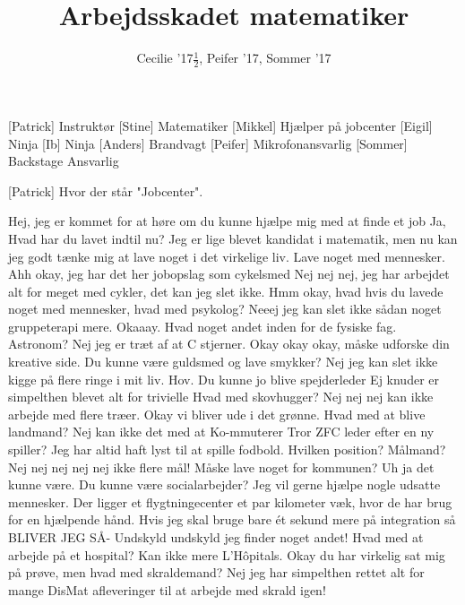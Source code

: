 \documentclass[a4paper,11pt]{article}
\title{Arbejdsskadet matematiker}
\author{Cecilie '17$\frac{1}{2}$, Peifer '17, Sommer '17}
\begin{document}
\maketitle

\begin{roles}
[Patrick] Instruktør
[Stine] Matematiker
[Mikkel] Hjælper på jobcenter
[Eigil] Ninja
[Ib] Ninja
[Anders] Brandvagt
[Peifer] Mikrofonansvarlig
[Sommer] Backstage Ansvarlig
\end{roles}

\begin{props}
    [Patrick]
     Hvor der står "Jobcenter".
\end{props}

\begin{sketch}

 Hej, jeg er kommet for at høre om du kunne hjælpe mig med at finde et job
 Ja, Hvad har du lavet indtil nu?
 Jeg er lige blevet kandidat i matematik, men nu kan jeg godt tænke mig at lave noget i det virkelige liv. Lave noget med mennesker.
 Ahh okay, jeg har det her jobopslag som cykelsmed
 Nej nej nej, jeg har arbejdet alt for meget med cykler, det kan jeg slet ikke.
 Hmm okay, hvad hvis du lavede noget med mennesker, hvad med psykolog?
 Neeej jeg kan slet ikke sådan noget gruppeterapi mere.
 Okaaay. Hvad noget andet inden for de fysiske fag. Astronom?
 Nej jeg er træt af at C stjerner.
Okay okay okay, måske udforske din kreative side. Du kunne være guldsmed og lave smykker? 
 Nej jeg kan slet ikke kigge på flere ringe i mit liv.
 Hov. Du kunne jo blive spejderleder
 Ej knuder er simpelthen blevet alt for trivielle
 Hvad med skovhugger?
 Nej nej nej kan ikke arbejde med flere træer.
 Okay vi bliver ude i det grønne. Hvad med at blive landmand?
 Nej kan ikke det med at Ko-mmuterer
 Tror ZFC leder efter en ny spiller?
 Jeg har altid haft lyst til at spille fodbold. Hvilken position?
 Målmand?
 Nej nej nej nej nej ikke flere mål!
 Måske lave noget for kommunen?
 Uh ja det kunne være.
 Du kunne være socialarbejder?
 Jeg vil gerne hjælpe nogle udsatte mennesker.
 Der ligger et flygtningecenter et par kilometer væk, hvor de har brug for en hjælpende hånd.
 Hvis jeg skal bruge bare ét sekund mere på integration så BLIVER JEG SÅ-
 Undskyld undskyld jeg finder noget andet! Hvad med at arbejde på et hospital?
 Kan ikke mere L’Hôpitals. 
 Okay du har virkelig sat mig på prøve, men hvad med skraldemand?
 Nej jeg har simpelthen rettet alt for mange DisMat afleveringer til at arbejde med skrald igen!

\end{sketch}
\end{document}
